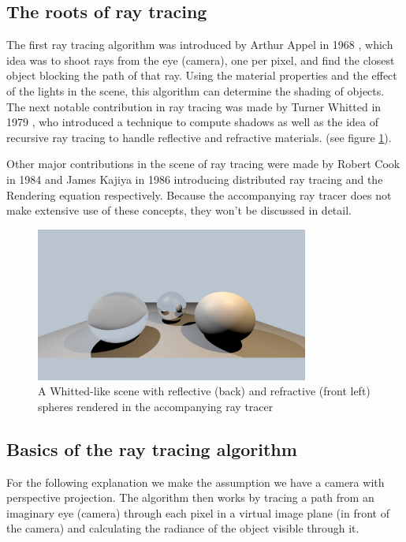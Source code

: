 \documentclass{article}
\begin{document}
\subsection{The roots of ray tracing}
The first ray tracing algorithm was introduced by Arthur Appel in 1968 \cite{appel}, which idea was to shoot rays from the eye (camera), one per pixel, and find the closest object blocking the path of that ray. Using the material properties and the effect of the lights in the scene, this algorithm can determine the shading of objects. \\
The next notable contribution in ray tracing was made by Turner Whitted in 1979 \cite{whitted}, who introduced a technique to compute shadows as well as the idea of recursive ray tracing to handle reflective and refractive materials. (see figure \ref{fig:whitted_example}).  

Other major contributions in the scene of ray tracing were made by Robert Cook in 1984 \cite{cook} and James Kajiya in 1986 \citep{kajiya} introducing distributed ray tracing and the Rendering equation respectively. Because the accompanying ray tracer does not make extensive use of these concepts, they won't be discussed in detail.

\begin{figure}[h]
	\centering
    \includegraphics[width=0.8\textwidth]{whitted_example}
    \caption{A Whitted-like scene with reflective (back) and refractive (front left) spheres rendered in the accompanying ray tracer}
    \label{fig:whitted_example}
\end{figure}

\subsection{Basics of the ray tracing algorithm}
For the following explanation we make the assumption we have a camera with perspective projection. The algorithm then works by tracing a path from an imaginary eye (camera) through each pixel in a virtual image plane (in front of the camera) and calculating the radiance of the object visible through it.
\end{document}
